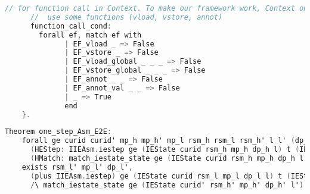 \begin{lstlisting}[language=C]
      // for function call in Context. To make our framework work, Context on our layers should not 
      //  use some functions (vload, vstore, annot) 
      function_call_cond:
        forall ef, match ef with
              | EF_vload _ => False
              | EF_vstore _ => False
              | EF_vload_global _ _ _ => False
              | EF_vstore_global _ _ _ => False
              | EF_annot _ _ => False
              | EF_annot_val _ _ => False
              | _ => True
              end
    }.
\end{lstlisting}

\begin{lstlisting}[language=C]
  Theorem one_step_Asm_E2E:
    forall ge curid curid' mp_h mp_h' mp_l rsm_h rsm_l rsm_h' l l' (dp_h dp_l dp_h' : ZMap.t (option dproc)) t
      (HEStep: IIEAsm.iestep ge (IEState curid rsm_h mp_h dp_h l) t (IEState curid' rsm_h' mp_h' dp_h' l'))
      (HMatch: match_iestate_state ge (IEState curid rsm_h mp_h dp_h l) (IEState curid rsm_l mp_l dp_l l)),
    exists rsm_l' mp_l' dp_l',
      (plus IIEAsm.iestep) ge (IEState curid rsm_l mp_l dp_l l) t (IEState curid' rsm_l' mp_l' dp_l' l')
      /\ match_iestate_state ge (IEState curid' rsm_h' mp_h' dp_h' l') (IEState curid' rsm_l' mp_l' dp_l' l').
\end{lstlisting}